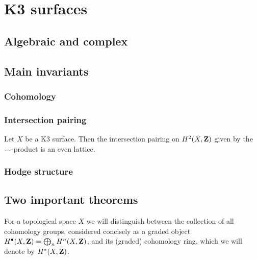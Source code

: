 \section{K3 surfaces}

\subsection{Algebraic and complex}

\subsection{Main invariants}

\subsubsection{Cohomology}
\subsubsection{Intersection pairing}

\begin{proposition}
    \label{intersection pairing on K3 is even}
    Let $X$ be a K3 surface. Then the intersection pairing on $H^2(X, \mathbf Z)$ given by the $\smallsmile$-product is an even lattice. 
\end{proposition}

\subsubsection{Hodge structure}

\subsection{Two important theorems}

\begin{theorem}
    \label{Classical Torelli theorem}
\end{theorem}

\begin{remark}
    For a topological space $X$ we will distinguish between the collection of all cohomology groups, considered concisely as a graded object $H^{\bullet}(X, \mathbf Z) = \bigoplus_n H^{n}(X, \mathbf Z)$, and its (graded) cohomology ring, which we will denote by $H^{*}(X, \mathbf Z)$.
\end{remark}